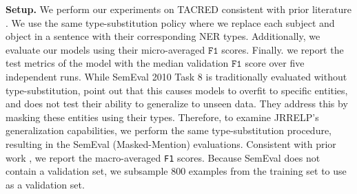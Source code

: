 \textbf{Setup.}
We perform our experiments on TACRED consistent with prior literature \citep{palstm, cgcn, aggcn}.
We use the same type-substitution policy where we replace each subject and object in a sentence with their corresponding NER types.
Additionally, we evaluate our models using their micro-averaged $\texttt{F1}$ scores.
Finally. we report the test metrics of the model with the median validation $\texttt{F1}$ score over five independent runs.
While SemEval 2010 Task 8 is traditionally evaluated without type-substitution, \citet{cgcn} point out that this causes models to overfit to specific entities, and does not test their ability to generalize to unseen data.
They address this by masking these entities using their types.
Therefore, to examine JRRELP's generalization capabilities, we perform the same type-substitution procedure, resulting in the SemEval (Masked-Mention) evaluations.
Consistent with prior work  \citep{palstm,cgcn,aggcn,tre, bert-em}, we report the macro-averaged \texttt{F1} scores. 
Because SemEval does not contain a validation set, we subsample $800$ examples from the training set to use as a validation set.


